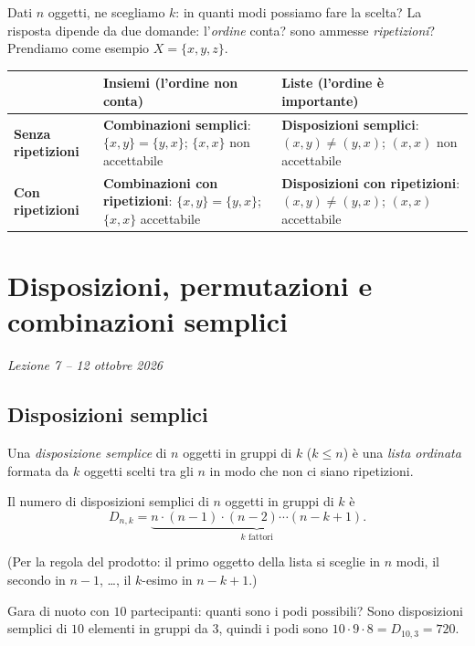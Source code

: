 \documentclass[11pt,a4paper]{article}
\begin{document}
Dati $n$ oggetti, ne scegliamo $k$: in quanti modi possiamo fare la scelta? La risposta dipende da due domande: l'\emph{ordine} conta? sono ammesse \emph{ripetizioni}? Prendiamo come esempio $X = \{x, y, z\}$.

\begin{center}
\renewcommand{\arraystretch}{1.4}
\begin{tabular}{@{}l|p{5.2cm}|p{5.2cm}@{}}
 & \textbf{Insiemi} (l'ordine non conta) & \textbf{Liste} (l'ordine è importante) \\ \midrule
\textbf{Senza ripetizioni}
 & \textbf{Combinazioni semplici}: $\{x,y\} = \{y,x\}$; $\{x,x\}$ non accettabile
 & \textbf{Disposizioni semplici}: $(x,y) \neq (y,x)$; $(x,x)$ non accettabile \\ \midrule
\textbf{Con ripetizioni}
 & \textbf{Combinazioni con ripetizioni}: $\{x,y\} = \{y,x\}$; $\{x,x\}$ accettabile
 & \textbf{Disposizioni con ripetizioni}: $(x,y) \neq (y,x)$; $(x,x)$ accettabile
\end{tabular}
\end{center}

\section[Disposizioni, permutazioni e combinazioni semplici (Lezione 7 -- 12 ottobre 2026)]{Disposizioni, permutazioni e combinazioni semplici}
\noindent\emph{Lezione 7 -- 12 ottobre 2026}
\subsection{Disposizioni semplici}

\begin{definizione}
Una \emph{disposizione semplice} di $n$ oggetti in gruppi di $k$ ($k \leq n$) è una \emph{lista ordinata} formata da $k$ oggetti scelti tra gli $n$ in modo che non ci siano ripetizioni.
\end{definizione}

\begin{proposizione}
Il numero di disposizioni semplici di $n$ oggetti in gruppi di $k$ è
\[
D_{n,k} = \underbrace{n \cdot (n-1)\cdot(n-2) \cdots (n-k+1)}_{k \text{ fattori}} .
\]
\end{proposizione}

(Per la regola del prodotto: il primo oggetto della lista si sceglie in $n$ modi, il secondo in $n-1$, \dots, il $k$-esimo in $n-k+1$.)

\begin{esempio}
Gara di nuoto con $10$ partecipanti: quanti sono i podi possibili? Sono disposizioni semplici di $10$ elementi in gruppi da $3$, quindi i podi sono $10 \cdot 9 \cdot 8 = D_{10,3} = 720$.
\end{esempio}
\end{document}
